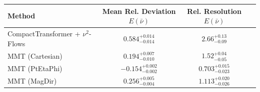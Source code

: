     \begin{tabular}{lccc}
        \toprule
        Method & Mean Rel. Deviation $E(\bar{\nu})$ & Rel. Resolution $E(\bar{\nu})$ \\
        \midrule
        CompactTransformer + $\nu^2$-Flows & $0.584^{+0.014}_{-0.014}$ & $2.66^{+0.13}_{-0.09}$ \\
        MMT (Cartesian) & $0.194^{+0.007}_{-0.010}$ & $1.52^{+0.04}_{-0.05}$ \\
        MMT (PtEtaPhi) & $-0.154^{+0.002}_{-0.002}$ & $0.703^{+0.015}_{-0.023}$ \\
        MMT (MagDir) & $0.256^{+0.005}_{-0.004}$ & $1.113^{+0.020}_{-0.026}$ \\
        \bottomrule
    \end{tabular}